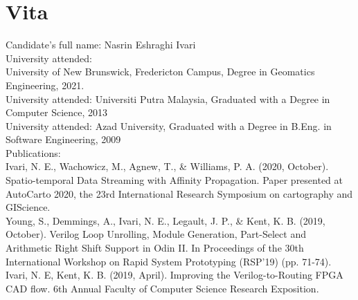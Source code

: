 \clearpage
{}  %
\chapter*{Vita}
\pagestyle{empty}
\thispagestyle{empty}
\singlespacing
Candidate's full name: Nasrin Eshraghi Ivari\\
University attended: \\

University of New Brunswick, Fredericton Campus, Degree in Geomatics Engineering, 2021.\\

University attended: Universiti Putra Malaysia, Graduated with a Degree in Computer Science, 2013\\

University attended: Azad University, Graduated with a Degree in B.Eng. in Software Engineering, 2009\\


Publications:\\

Ivari, N. E., Wachowicz, M., Agnew, T., \& Williams, P. A. (2020, October). Spatio-temporal Data Streaming with Affinity Propagation. Paper presented at AutoCarto 2020, the 23rd International Research Symposium on cartography and GIScience.\\


Young, S., Demmings, A., Ivari, N. E., Legault, J. P., \& Kent, K. B. (2019, October). Verilog Loop Unrolling, Module Generation, Part-Select and Arithmetic Right Shift Support in Odin II. In Proceedings of the 30th International Workshop on Rapid System Prototyping (RSP'19) (pp. 71-74).\\


Ivari, N. E, Kent, K. B. (2019, April). Improving the Verilog-to-Routing FPGA CAD flow. 6th Annual Faculty of Computer Science Research Exposition.\\


